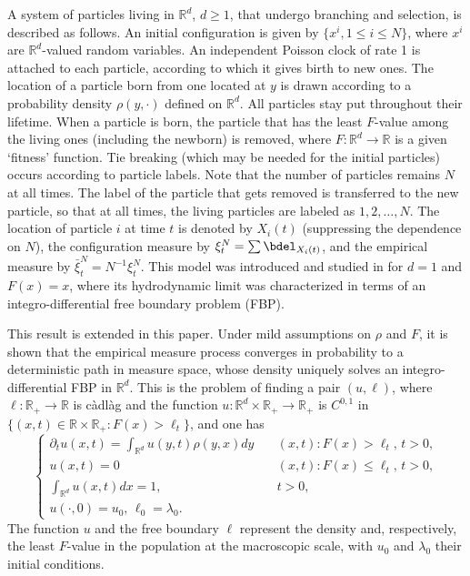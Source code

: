 \documentclass[11pt]{amsart}
\theoremstyle{plain}
\newcommand{\la}{\lambda}
\newcommand{\R}{{\mathbb R}}
\newcommand{\pl}{\partial}
\newcommand{\cadlag}{c\`adl\`ag }
\newcommand{\ds}{\displaystyle}
\newcommand{\F}{F}
\begin{document}
A system of particles living in $\R^d$,
$d\ge1$, that undergo branching and selection, is described as follows.
An initial configuration is given by $\{x^i,1\le i\le N\}$, where $x^i$ are $\R^d$-valued random variables. An independent Poisson clock of rate 1 is attached to each particle, according to which it gives birth to new ones.
The location of a particle born from one located at $y$ is drawn according
to a probability density $\rho(y,\cdot)$ defined on $\R^d$. All particles stay put throughout their lifetime. When a particle is born, the particle that has
the least $\F$-value among the living ones (including the newborn)
is removed, where $\F:\R^d\to\R$ is a given `fitness' function.
Tie breaking (which may be needed for the initial particles) occurs according to particle labels.
Note that the number of particles remains $N$ at all times.
The label of the particle that gets removed is transferred
to the new particle, so that at all times, the living particles are labeled
as $1,2,\ldots,N$. The location of particle $i$ at time $t$
is denoted by $X_i(t)$ (suppressing the dependence on $N$),
the configuration measure by $\xi^N_t=\sum\bdel_{X_i(t)}$,
and the empirical measure by $\bar\xi^N_t=N^{-1}\xi^N_t$. This model was introduced and studied in \cite{dur11} for $d=1$ and $\F(x)=x$,
where its hydrodynamic limit was characterized in terms of
an integro-differential free boundary problem (FBP).

This result is extended in
this paper. Under mild assumptions on $\rho$ and $\F$, it is shown
that the empirical measure process converges in probability
to a deterministic path in measure space, whose density uniquely solves
an integro-differential FBP in $\R^d$. This is
the problem of finding a pair $(u,\ell)$, where $\ell:\R_+\to\R$
is \cadlag and the function $u:\R^d\times\R_+\to\R_+$ is $C^{0,1}$ in
$\{(x,t)\in\R\times\R_+:\F(x)>\ell_t\}$, and one has
\[
\begin{cases}\ds
\pl_tu(x,t)=\int_{\R^d}u(y,t)\rho(y,x)dy & \quad (x,t):\F(x)>\ell_t,\,t>0,\\
u(x,t)=0 & \quad (x,t):\F(x)\le\ell_t,\,t>0, \\
\ds
\int_{\R^d}u(x,t)dx=1, & \quad t>0, \\
u(\cdot,0)=u_0,\,\ell_0=\la_0.
\end{cases}
\]
The function $u$ and the free boundary $\ell$ represent the density and, respectively, the least $F$-value in the population at the macroscopic scale, with $u_0$ and $\la_0$ their initial conditions.
\end{document}

